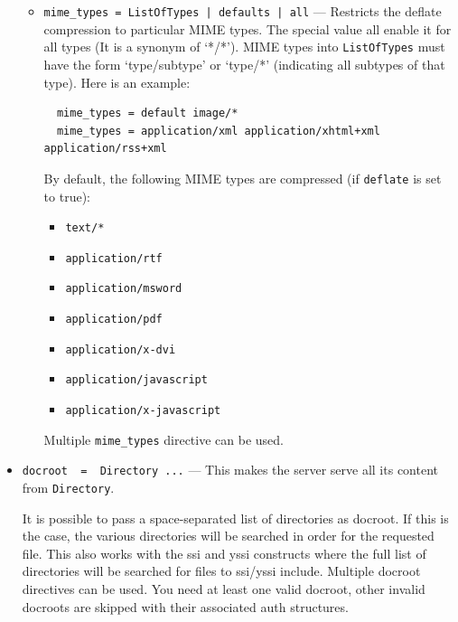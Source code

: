 \documentclass[11pt,oneside,english]{book}
\begin{document}
\begin{itemize}
\begin{itemize}
             \item \verb+mime_types = ListOfTypes | defaults | all+ ---
               Restricts the deflate compression to particular MIME types. The
               special value all enable it for all types (It is a synonym of
               `*/*'). MIME types into \verb+ListOfTypes+ must have the form
               `type/subtype' or `type/*' (indicating all subtypes of that
               type). Here is an example:
\begin{verbatim}
  mime_types = default image/*
  mime_types = application/xml application/xhtml+xml application/rss+xml
\end{verbatim}
                    By default, the following MIME types are compressed (if
                    \verb+deflate+ is set to true):

                    \begin{itemize}
                    \item \verb+text/*+
                    \item \verb+application/rtf+
                    \item \verb+application/msword+
                    \item \verb+application/pdf+
                    \item \verb+application/x-dvi+
                    \item \verb+application/javascript+
                    \item \verb+application/x-javascript+
                    \end{itemize}
                    Multiple \verb+mime_types+ directive can be used.
             \end{itemize}

\item       \verb+docroot  =  Directory ...+ ---
              This makes the server serve all its content from
              \verb+Directory+.

              It is possible to pass a space-separated list of directories as
              docroot. If this is the case, the various directories will be
              searched in order for the requested file. This also works with the
              ssi and yssi constructs where the full list of directories will be
              searched for files to ssi/yssi include. Multiple docroot
              directives can be used.  You need at least one valid docroot,
              other invalid docroots are skipped with their associated auth
              structures.


\end{itemize}
\end{document}
